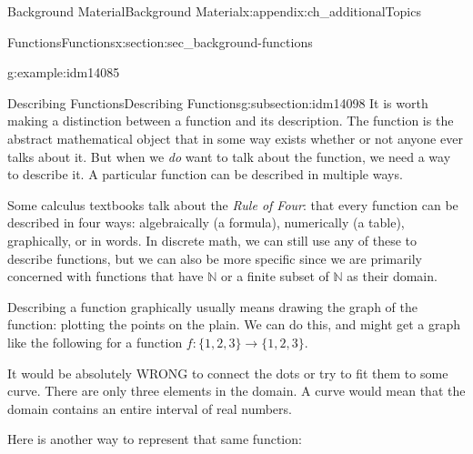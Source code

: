 \documentclass[oneside,10pt,]{book}
\numberwithin{equation}{chapter}
\def\N{\mathbb N}
\begin{document}
\begin{appendixptx}{Background Material}{}{Background Material}{}{}{x:appendix:ch_additionalTopics}
\begin{sectionptx}{Functions}{}{Functions}{}{}{x:section:sec_background-functions}
\begin{introduction}{}
\begin{example}{}{g:example:idm14085}
\begin{enumerate}
\end{enumerate}
%
\end{example}
\end{introduction}%
%
%
\typeout{************************************************}
\typeout{************************************************}
%
\begin{subsectionptx}{Describing Functions}{}{Describing Functions}{}{}{g:subsection:idm14098}
It is worth making a distinction between a function and its description.  The function is the abstract mathematical object that in some way exists whether or not anyone ever talks about it.  But when we \emph{do} want to talk about the function, we need a way to describe it.  A particular function can be described in multiple ways.%
\par
Some calculus textbooks talk about the \emph{Rule of Four}: that every function can be described in four ways: algebraically (a formula), numerically (a table), graphically, or in words.  In discrete math, we can still use any of these to describe functions, but we can also be more specific since we are primarily concerned with functions that have \(\N\) or a finite subset of \(\N\) as their domain.%
\par
Describing a function graphically usually means drawing the graph of the function: plotting the points on the plain. We can do this, and might get a graph like the following for a function \(f:\{1,2,3\} \to \{1,2,3\}\).%
\begin{sidebyside}{1}{0.35}{0.35}{0}%
\begin{sbspanel}{0.3}%
%
\end{sbspanel}%
\end{sidebyside}%
\par
It would be absolutely WRONG to connect the dots or try to fit them to some curve. There are only three elements in the domain. A curve would mean that the domain contains an entire interval of real numbers.%
\par
Here is another way to represent that same function:%
\begin{sidebyside}{1}{0.415}{0.415}{0}%
\begin{sbspanel}{0.17}%

\end{sbspanel}
\end{sidebyside}
\end{subsectionptx}
\end{sectionptx}
\end{appendixptx}
\end{document}
